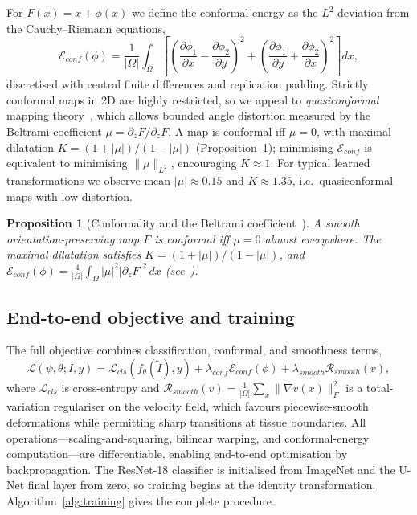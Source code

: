 \documentclass[pdflatex,sn-nature]{sn-jnl}%
\theoremstyle{thmstyleone}%
\newtheorem{proposition}[theorem]{Proposition}%
\theoremstyle{thmstyletwo}%
\theoremstyle{thmstylethree}%
\begin{document}
For $F(x)=x+\phi(x)$ we define the conformal energy as the $L^2$ deviation from
the Cauchy--Riemann equations,
\begin{equation}
\mathcal{E}_{conf}(\phi)=\frac{1}{|\Omega|}\int_\Omega\left[\left(\frac{\partial\phi_1}{\partial x}-\frac{\partial\phi_2}{\partial y}\right)^2+\left(\frac{\partial\phi_1}{\partial y}+\frac{\partial\phi_2}{\partial x}\right)^2\right]dx,
\label{eq:conformal_energy}
\end{equation}
discretised with central finite differences and replication padding. Strictly
conformal maps in 2D are highly restricted, so we appeal to \textit{quasiconformal}
mapping theory~\cite{ahlfors2006conformal}, which allows bounded angle distortion
measured by the Beltrami coefficient $\mu=\partial_{\bar z}F/\partial_z F$. A map
is conformal iff $\mu=0$, with maximal dilatation $K=(1+|\mu|)/(1-|\mu|)$
(Proposition~\ref{prop:beltrami}); minimising $\mathcal{E}_{conf}$ is equivalent
to minimising $\|\mu\|_{L^2}$, encouraging $K\approx1$. For typical learned
transformations we observe mean $|\mu|\approx0.15$ and $K\approx1.35$, i.e.\
quasiconformal maps with low distortion.

\begin{proposition}[Conformality and the Beltrami coefficient~\cite{ahlfors2006conformal}]
\label{prop:beltrami}
A smooth orientation-preserving map $F$ is conformal iff $\mu=0$ almost
everywhere. The maximal dilatation satisfies $K=(1+|\mu|)/(1-|\mu|)$, and
$\mathcal{E}_{conf}(\phi)=\frac{4}{|\Omega|}\int_\Omega|\mu|^2|\partial_zF|^2\,dx$
(see~\cite{lui2014brain}).
\end{proposition}

\subsection{End-to-end objective and training}

The full objective combines classification, conformal, and smoothness terms,
\begin{equation}
\mathcal{L}(\psi,\theta;I,y)=\mathcal{L}_{cls}(f_\theta(\tilde{I}),y)+\lambda_{conf}\mathcal{E}_{conf}(\phi)+\lambda_{smooth}\mathcal{R}_{smooth}(v),
\label{eq:full_loss}
\end{equation}
where $\mathcal{L}_{cls}$ is cross-entropy and
$\mathcal{R}_{smooth}(v)=\frac{1}{|\Omega|}\sum_{x}\|\nabla v(x)\|_F^2$ is a
total-variation regulariser on the velocity field, which favours piecewise-smooth
deformations while permitting sharp transitions at tissue boundaries. All
operations---scaling-and-squaring, bilinear warping, and conformal-energy
computation---are differentiable, enabling end-to-end optimisation by
backpropagation. The ResNet-18 classifier is initialised from ImageNet and the
U-Net final layer from zero, so training begins at the identity transformation.
Algorithm~\ref{alg:training} gives the complete procedure.
\end{document}
